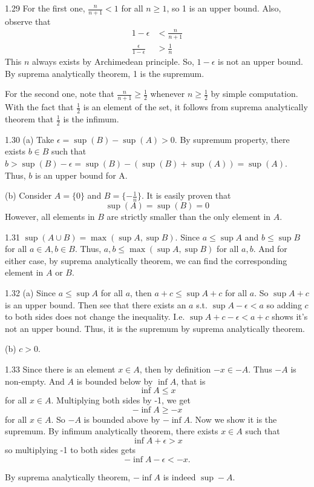 1.29 For the first one, $\frac{n}{n+1} < 1$ for all $n \geq 1$, so 1 is an upper bound. Also, observe that
\begin{align}
    1 - \epsilon &< \frac{n}{n+1} \\
    \frac{\epsilon}{1-\epsilon} &> \frac{1}{n}
\end{align}
This $n$ always exists by Archimedean principle. So, $1-\epsilon$ is not an upper bound. By suprema analytically theorem, 1 is the supremum.

For the second one, note that $\frac{n}{n+1} \geq \frac{1}{2}$ whenever $n\geq\frac{1}{2}$ by simple computation. With the fact that $\frac{1}{2}$ is an element of the set, 
it follows from suprema analytically theorem that $\frac{1}{2}$ is the infimum.

1.30 (a) Take $\epsilon=\sup(B)-\sup(A) > 0$. By supremum property, there exists $b \in B$ such that $b > \sup(B)-\epsilon = \sup(B)-(\sup(B)+\sup(A)) = \sup(A)$. Thus, $b$ is an upper bound for A. 

(b) Consider $A=\{0\}$ and $B=\{-\frac{1}{n}\}$. It is easily proven that $$\sup(A) = \sup(B) = 0$$ However, all elements in $B$ are strictly smaller than the only element in $A$.

1.31 $\sup (A \cup B) = \max (\sup A, \sup B)$. Since $a \leq \sup A$ and $b \leq \sup B$ for all $a \in A, b \in B$. Thus, $a,b \leq  \max (\sup A, \sup B)$ for all $a,b$. And for either case, by suprema analytically theorem, we can find the corresponding element in $A$ or $B$.

1.32 (a) Since $a \leq \sup A$ for all $a$, then $a + c \leq \sup A + c$ for all $a$. So $\sup A + c$ is an upper bound. Then see that there exists an $a$ s.t. $\sup A - \epsilon < a$ so adding
$c$ to both sides does not change the inequality. I.e. $\sup A + c - \epsilon < a + c$ shows it's not an upper bound. Thus, it is the supremum by suprema analytically theorem.

(b) $c > 0$.

1.33 Since there is an element $x \in A$, then by definition $-x \in -A$. Thus $-A$ is non-empty. And $A$ is bounded below by $\inf A$, that is
\[\inf A \leq x\] for all $x \in A$. Multiplying both sides by -1, we get \[-\inf A \geq -x\] for all $x \in A$. So 
$-A$ is bounded above by $-\inf A$. Now we show it is the supremum. By infimum analytically theorem, there exists $x \in A$ such that
\[\inf A + \epsilon > x\] so multiplying -1 to both sides gets \[-\inf A - \epsilon < -x.\]

By suprema analytically theorem, $-\inf A$ is indeed $\sup -A$.

